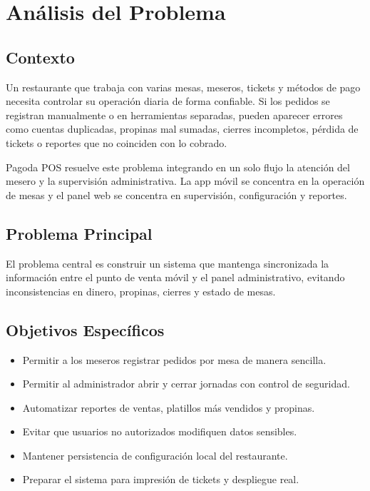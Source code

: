 \documentclass[11pt,letterpaper,openany]{report}
\newcommand{\projectname}{Pagoda POS}
\begin{document}
\chapter{Análisis del Problema}

\section{Contexto}

Un restaurante que trabaja con varias mesas, meseros, tickets y métodos de pago necesita controlar su operación diaria de forma confiable. Si los pedidos se registran manualmente o en herramientas separadas, pueden aparecer errores como cuentas duplicadas, propinas mal sumadas, cierres incompletos, pérdida de tickets o reportes que no coinciden con lo cobrado.

\projectname{} resuelve este problema integrando en un solo flujo la atención del mesero y la supervisión administrativa. La app móvil se concentra en la operación de mesas y el panel web se concentra en supervisión, configuración y reportes.

\section{Problema Principal}

El problema central es construir un sistema que mantenga sincronizada la información entre el punto de venta móvil y el panel administrativo, evitando inconsistencias en dinero, propinas, cierres y estado de mesas.

\section{Objetivos Específicos}

\begin{itemize}
  \item Permitir a los meseros registrar pedidos por mesa de manera sencilla.
  \item Permitir al administrador abrir y cerrar jornadas con control de seguridad.
  \item Automatizar reportes de ventas, platillos más vendidos y propinas.
  \item Evitar que usuarios no autorizados modifiquen datos sensibles.
  \item Mantener persistencia de configuración local del restaurante.
  \item Preparar el sistema para impresión de tickets y despliegue real.
\end{itemize}
\end{document}
